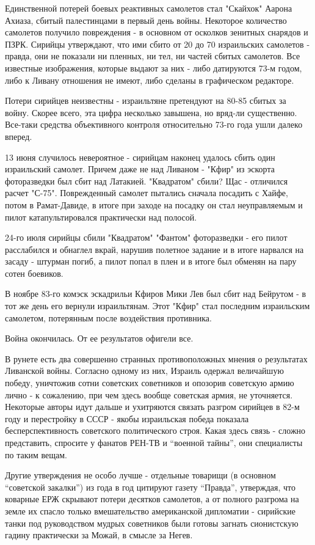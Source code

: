 Единственной потерей боевых реактивных самолетов стал "Скайхок" Аарона Ахиаза, сбитый палестинцами в первый день войны. Некоторое количество самолетов получило повреждения - в основном от осколков зенитных снарядов и ПЗРК. Сирийцы утверждают, что ими сбито от 20 до 70 израильских самолетов - правда, они не показали ни пленных, ни тел, ни частей сбитых самолетов. Все известные изображения, которые выдают за них - либо датируются 73-м годом, либо к Ливану отношения не имеют, либо сделаны в графическом редакторе.

Потери сирийцев неизвестны - израильтяне претендуют на 80-85 сбитых за войну. Скорее всего, эта цифра несколько завышена, но вряд-ли существенно. Все-таки средства объективного контроля относительно 73-го года ушли далеко вперед.

13 июня случилось невероятное - сирийцам наконец удалось сбить один израильский самолет. Причем даже не над Ливаном - "Кфир" из эскорта фоторазведки был сбит над Латакией. "Квадратом" сбили? Щас - отличился расчет "С-75". Поврежденный самолет пытались сначала посадить с Хайфе, потом в Рамат-Давиде, в итоге при заходе на посадку он стал неуправляемым и пилот катапультировался практически над полосой.

24-го июля сирийцы сбили "Квадратом" "Фантом" фоторазведки - его пилот расслабился и обнаглел вкрай, нарушив полетное задание и в итоге нарвался на засаду - штурман погиб, а пилот попал в плен и в итоге был обменян на пару сотен боевиков.

В ноябре 83-го комэск эскадрильи Кфиров Мики Лев был сбит над Бейрутом - в тот же день его вернули израильтянам. Этот "Кфир" стал последним израильским самолетом, потерянным после воздействия противника.

Война окончилась. От ее результатов офигели все.

В рунете есть два совершенно странных противоположных мнения о результатах Ливанской войны. Согласно одному из них, Израиль одержал величайшую победу, уничтожив сотни советских советников и опозорив советскую армию лично - к сожалению, при чем здесь вообще советская армия, не уточняется. Некоторые авторы идут дальше и ухитряются связать разгром сирийцев в 82-м году и перестройку в СССР - якобы израильская победа показала бесперспективность советского политического строя. Какая здесь связь - сложно представить, спросите у фанатов РЕН-ТВ и “военной тайны”, они специалисты по таким вещам.

Другие утверждения не особо лучше - отдельные товарищи (в основном “советской закалки”) из года в год цитируют газету “Правда”, утверждая, что коварные ЕРЖ скрывают потери десятков самолетов, а от полного разгрома на земле их спасло только вмешательство американской дипломатии - сирийские танки под руководством мудрых советников были готовы загнать сионистскую гадину практически за Можай, в смысле за Негев.

